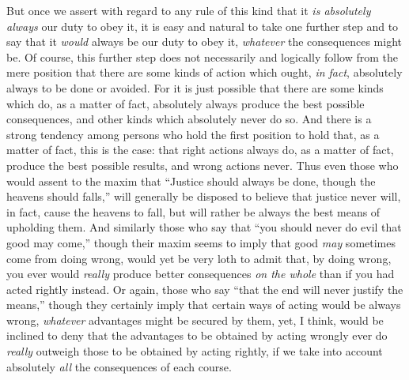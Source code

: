 But once we assert with regard to any rule of this kind that it
\textit{is absolutely always} our duty to obey it, it is easy and
natural to take one further step and to say that it \textit{would}
always be our duty to obey it, \textit{whatever} the consequences
might be. Of course, this further step does not necessarily and
logically follow from the mere position that there are some kinds of
action which ought, \textit{in fact}, absolutely always to be done or
avoided. For it is just possible that there are some kinds which do,
as a matter of fact, absolutely always produce the best possible
consequences, and other kinds which absolutely never do so. And there
is a strong tendency among persons who hold the first position to hold
that, as a matter of fact, this is the case: that right actions always
do, as a matter of fact, produce the best possible results, and wrong
actions never. Thus even those who would  assent to the
maxim that ``Justice should always be done, though the heavens should
falls,'' will generally be disposed to believe that justice never
will, in fact, cause the heavens to fall, but will rather be always
the best means of upholding them. And similarly those who say that
``you should never do evil that good may come,'' though their maxim
seems to imply that good \textit{may} sometimes come from doing wrong,
would yet be very loth to admit that, by doing wrong, you ever would
\textit{really} produce better consequences \textit{on the whole} than
if you had acted rightly instead. Or again, those who say ``that the
end will never justify the means,'' though they certainly imply that
certain ways of acting would be always wrong, \textit{whatever}
advantages might be secured by them, yet, I think, would be inclined
to deny that the advantages to be obtained by acting wrongly ever do
\textit{really} outweigh those to be obtained by acting rightly, if we
take into account absolutely \textit{all} the consequences of each
course.

